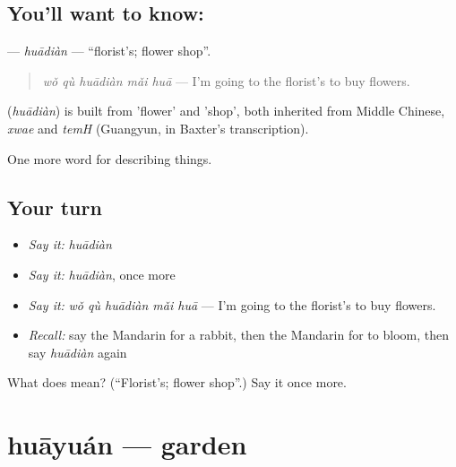 \subsection*{You'll want to know: }
\textbf{} — \emph{huādiàn} — \textquotedblleft{}florist's; flower shop\textquotedblright{}.

\begin{quote}
\textbf{} \emph{wǒ qù huādiàn mǎi huā} — I'm going to the florist's to buy flowers.
\end{quote}

\begin{cousinweb}
\textbf{} (\emph{huādiàn}) is built from  'flower' and  'shop', both inherited from Middle Chinese, \emph{xwae} and \emph{temH} (Guangyun, in Baxter's transcription).
\end{cousinweb}

\begin{grammarlens}[title={What you've built}]
One more word for describing things.
\end{grammarlens}

\subsection*{Your turn}
\begin{itemize}
\raggedright
  \item \emph{Say it:} \emph{huādiàn}
  \item \emph{Say it:} \emph{huādiàn}, once more
  \item \emph{Say it:} \emph{wǒ qù huādiàn mǎi huā} — I'm going to the florist's to buy flowers.
  \item \emph{Recall:} say the Mandarin for a rabbit, then the Mandarin for to bloom, then say \emph{huādiàn} again
\end{itemize}

\begin{tcolorbox}[breakable,colback=teal!4,colframe=teal!35!black,title={Before you move on}]
What does  mean? (\textquotedblleft{}Florist's; flower shop\textquotedblright{}.) Say it once more.
\end{tcolorbox}
\section[huāyuán]{huāyuán — garden}

\label{lesson:ZH-C224-huayuan}



